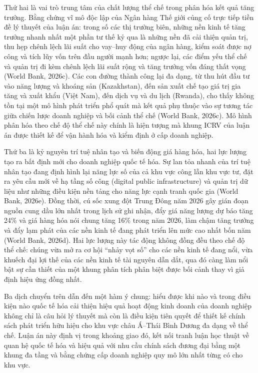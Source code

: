 \documentclass[
  a4paper,
  13pt]{extreport}
\begin{document}
Thứ hai là vai trò trung tâm của chất lượng thể chế trong phân hóa kết
quả tăng trưởng. Bằng chứng vĩ mô độc lập của Ngân hàng Thế giới củng cố
trực tiếp tiền đề lý thuyết của luận án: trong số các thị trường biên,
những nền kinh tế tăng trưởng nhanh nhất một phần tư thế kỷ qua là những
nền đã cải thiện quản trị, thu hẹp chênh lệch lãi suất cho vay--huy động
của ngân hàng, kiểm soát được nợ công và tích lũy vốn trên đầu người
mạnh hơn; ngược lại, các điểm yếu thể chế và quản trị đi kèm chênh lệch
lãi suất rộng và tăng trưởng vốn đáng thất vọng (World Bank, 2026c). Các
con đường thành công lại đa dạng, từ thu hút đầu tư vào năng lượng và
khoáng sản (Kazakhstan), đến sản xuất chế tạo giá trị gia tăng và xuất
khẩu (Việt Nam), đến dịch vụ và du lịch (Rwanda), cho thấy không tồn tại
một mô hình phát triển phổ quát mà kết quả phụ thuộc vào sự tương tác
giữa chiến lược doanh nghiệp và bối cảnh thể chế (World Bank, 2026c). Mô
hình phân hóa theo chế độ thể chế này chính là hiện tượng mà khung ICRV
của luận án được thiết kế để vận hành hóa và kiểm định ở cấp doanh
nghiệp.

Thứ ba là kỷ nguyên trí tuệ nhân tạo và biến động giá hàng hóa, hai lực
lượng tạo ra bất định mới cho doanh nghiệp quốc tế hóa. Sự lan tỏa nhanh
của trí tuệ nhân tạo đang định hình lại năng lực số của cả khu vực công
lẫn khu vực tư, đặt ra yêu cầu mới về hạ tầng số công (digital public
infrastructure) và quản trị dữ liệu như những điều kiện nền tảng cho
năng lực cạnh tranh quốc gia (World Bank, 2026e). Đồng thời, cú sốc xung
đột Trung Đông năm 2026 gây gián đoạn nguồn cung dầu lớn nhất trong lịch
sử ghi nhận, đẩy giá năng lượng dự báo tăng 24\% và giá hàng hóa nói
chung tăng 16\% trong năm 2026, làm chậm tăng trưởng và đẩy lạm phát của
các nền kinh tế đang phát triển lên mức cao nhất bốn năm (World Bank,
2026d). Hai lực lượng này tác động không đồng đều theo chế độ thể chế:
chúng vừa mở ra cơ hội ``nhảy vọt số'' cho các nền kinh tế đang nổi, vừa
khuếch đại lợi thế của các nền kinh tế tài nguyên dẫn dắt, qua đó càng
làm nổi bật sự cần thiết của một khung phân tích phân biệt được bối cảnh
thay vì giả định hiệu ứng đồng nhất.

Ba dịch chuyển trên dẫn đến một hàm ý chung: hiểu được khi nào và trong
điều kiện nào quốc tế hóa cải thiện hiệu quả hoạt động kinh doanh của
doanh nghiệp không chỉ là câu hỏi lý thuyết mà còn là điều kiện tiên
quyết để thiết kế chính sách phát triển hữu hiệu cho khu vực châu
Á--Thái Bình Dương đa dạng về thể chế. Luận án này định vị trong khoảng
giao đó, kết nối tranh luận học thuật về quan hệ quốc tế hóa và hiệu quả
với nhu cầu chính sách đương đại bằng một khung đa tầng và bằng chứng
cấp doanh nghiệp quy mô lớn nhất từng có cho khu vực.
\end{document}
